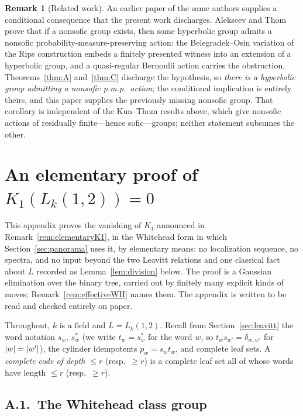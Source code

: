 \documentclass[11pt]{amsart}
\theoremstyle{definition}
\newtheorem{remark}[theorem]{Remark}
\theoremstyle{plain}
\DeclarePairedDelimiter{\abs}{\lvert}{\rvert}
\begin{document}
\begin{remark}[Related work]
An earlier paper of the same authors supplies a conditional consequence that the present work discharges.  Alekseev and Thom prove \cite[Corollary~E]{AlekseevThom25} that if a nonsofic group exists, then some hyperbolic group admits a nonsofic probability-measure-preserving action: the Belegradek--Osin variation of the Rips construction embeds a finitely presented witness into an extension of a hyperbolic group, and a quasi-regular Bernoulli action carries the obstruction.  Theorems~\ref{thm:A} and~\ref{thm:C} discharge the hypothesis, so \emph{there is a hyperbolic group admitting a nonsofic p.m.p.\ action}; the conditional implication is entirely theirs, and this paper supplies the previously missing nonsofic group.  That corollary is independent of the Kun--Thom results above, which give nonsofic actions of residually finite---hence sofic---groups; neither statement subsumes the other.
\end{remark}

\appendix

\section{An elementary proof of \texorpdfstring{$K_1(L_k(1,2))=0$}{K1(L)=0}}\label{app:K1}

This appendix proves the vanishing of \(K_1\) announced in Remark~\ref{rem:elementaryK1}, in the Whitehead form in which Section~\ref{sec:panorama} uses it, by elementary means: no localization sequence, no spectra, and no input beyond the two Leavitt relations and one classical fact about \(L\) recorded as Lemma~\ref{lem:division} below.  The proof is a Gaussian elimination over the binary tree, carried out by finitely many explicit kinds of moves; Remark~\ref{rem:effectiveWH} names them.  The appendix is written to be read and checked entirely on paper.

Throughout, \(k\) is a field and \(L=L_k(1,2)\).  Recall from Section~\ref{sec:leavitt} the word notation \(s_w\), \(s_w^*\) (we write \(t_w=s_w^*\) for the word \(w\), so \(t_w s_{w'}=\delta_{w,w'}\) for \(\abs w=\abs{w'}\)), the cylinder idempotents \(p_w=s_wt_w\), and complete leaf sets.  A \emph{complete code of depth \(\leq r\)} (resp.\ \(\geq r\)) is a complete leaf set all of whose words have length \(\leq r\) (resp.\ \(\geq r\)).

\subsection*{A.1.\ The Whitehead class group}
\end{document}
